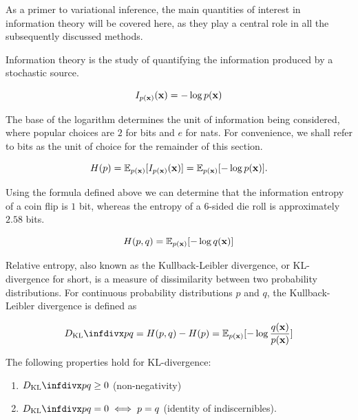As a primer to variational inference, the main quantities of interest in information theory will be covered here, as they play a central role in all the subsequently discussed methods.

Information theory is the study of quantifying the information produced by a stochastic source.


$$I_{p(\mathbf{x})}(\mathbf{x}) = -\log p(\mathbf{x})$$

The base of the logarithm determines the unit of information being considered, where popular choices are $2$ for bits and $e$ for nats. For convenience, we shall refer to bits as the unit of choice for the remainder of this section.


$$H(p) = \mathbb{E}_{p(\mathbf{x})}[I_{p(\mathbf{x})}(\mathbf{x})] = \mathbb{E}_{p(\mathbf{x})}[-\log p(\mathbf{x})].$$

Using the formula defined above we can determine that the information entropy of a coin flip is $1$ bit, whereas the entropy of a 6-sided die roll is approximately $2.58$ bits.


$$H(p,q) = \mathbb{E}_{p(\mathbf{x})}[-\log q(\mathbf{x})]$$

Relative entropy, also known as the Kullback-Leibler divergence, or KL-divergence for short, is a measure of dissimilarity between two probability distributions. For continuous probability distributions $p$ and $q$, the Kullback-Leibler divergence is defined as


$$\dkl{p}{q} = H(p,q) - H(p) = \mathbb{E}_{p(\bx)}[-\log \frac{q(\bx)}{p(\bx)}]$$


The following properties hold for KL-divergence:

\begin{enumerate}
\item $\dkl{p}{q} \geq 0$ (non-negativity)
\item $\dkl{p}{q} = 0 \iff p = q$ (identity of indiscernibles).
\end{enumerate}

